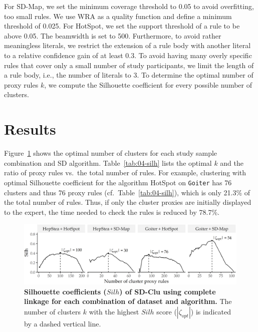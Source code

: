 \documentclass[
  oneside]{book}
\begin{document}
For SD-Map, we set the minimum coverage threshold to 0.05 to avoid overfitting, too small rules.
We use WRA as a quality function and define a minimum threshold of 0.025.
For HotSpot, we set the support threshold of a rule to be above 0.05.
The beamwidth is set to 500.
Furthermore, to avoid rather meaningless literals, we restrict the extension of a rule body with another literal to a relative confidence gain of at least 0.3.
To avoid having many overly specific rules that cover only a small number of study participants, we limit the length of a rule body, i.e., the number of literals to 3.
To determine the optimal number of proxy rules \(k\), we compute the Silhouette coefficient for every possible number of clusters.

\hypertarget{sdclu-results}{%
\section{Results}\label{sdclu-results}}

Figure~\ref{fig:04-silh-comparison} shows the optimal number of clusters for each study sample combination and SD algorithm.
Table~\ref{tab:04-silh} lists the optimal \(k\) and the ratio of proxy rules vs.~the total number of rules.
For example, clustering with optimal Silhouette coefficient for the algorithm HotSpot on \texttt{Goiter} has 76 clusters and thus 76 proxy rules (cf.~Table~\ref{tab:04-silh}), which is only 21.3\% of the total number of rules.
Thus, if only the cluster proxies are initially displayed to the expert, the time needed to check the rules is reduced by 78.7\%.



\begin{figure}[htb]

{\centering \includegraphics[width=1\linewidth]{figures/04-silh-comparison} 

}

\caption{\textbf{Silhouette coefficients (\(Silh\)) of SD-Clu using complete linkage for each combination of dataset and algorithm.} The number of clusters \(k\) with the highest \(Silh\) score (\(|\zeta_{opt}|\)) is indicated by a dashed vertical line.}\label{fig:04-silh-comparison}
\end{figure}
\end{document}
